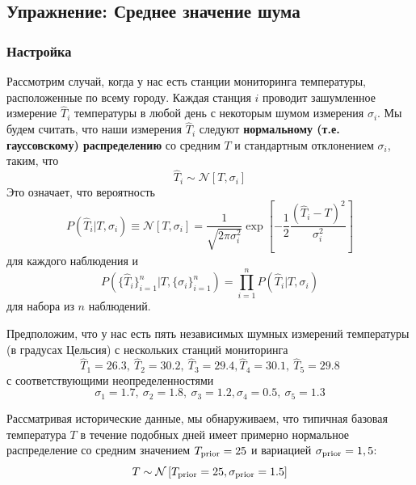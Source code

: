 \documentclass[12pt, titlepage]{article}
\newcommand{\Normal}[2]{\ensuremath{\mathcal{N}\left[{#1}, {#2} \right]}} %
\begin{document}
\subsection*{Упражнение: Среднее значение шума} \label{exercise:bayes}

\subsubsection*{Настройка}

Рассмотрим случай, когда у нас есть станции мониторинга температуры, расположенные по всему городу. Каждая станция $i$ проводит зашумленное измерение $\hat{T}_i$ температуры в любой день с некоторым шумом измерения $\sigma_i$. Мы будем считать, что наши измерения $\hat{T}_i$ следуют \textbf{нормальному (т.е. гауссовскому) распределению} со средним $T$ и стандартным отклонением $\sigma_i$, таким, что
\begin{equation*}
    \hat{T}_i \sim \Normal{T}{\sigma_i}
\end{equation*}
Это означает, что вероятность
\begin{equation*}
    P(\hat{T}_i|T,\sigma_i) \equiv \Normal{T}{\sigma_i}
    = \frac{1}{\sqrt{2\pi\sigma_i^2}}
    \exp\left[-\frac{1}{2}\frac{(\hat{T}_i - T)^2}{\sigma_i^2}\right]
\end{equation*}
для каждого наблюдения и
\begin{equation*}
    P(\{ \hat{T}_i \}_{i=1}^{n} | T, \{ \sigma_i \}_{i=1}^{n})
    = \prod_{i=1}^{n} P(\hat{T}_i|T,\sigma_i)
\end{equation*}
для набора из $n$ наблюдений.

Предположим, что у нас есть пять независимых шумных измерений температуры (в градусах Цельсия) с нескольких станций мониторинга
\begin{equation*}
    \hat{T}_1 = 26.3, \: \hat{T}_2 = 30.2, \: \hat{T}_3 = 29.4, 
    \hat{T}_4 = 30.1, \: \hat{T}_5 = 29.8
\end{equation*}
с соответствующими неопределенностями
\begin{equation*}
    \sigma_1 = 1.7, \: \sigma_2 = 1.8, \: \sigma_3 = 1.2, 
    \sigma_4 = 0.5, \: \sigma_5 = 1.3
\end{equation*}

Рассматривая исторические данные, мы обнаруживаем, что типичная базовая температура $T$ в течение подобных дней имеет примерно нормальное распределение со средним значением $T_{\rm prior}=25$ и вариацией $\sigma_{\rm prior} = 1,5$:
\begin{equation*}
    T \sim \Normal{T_{\rm prior}=25}{\sigma_{\rm prior}=1.5}
\end{equation*}
\end{document}
